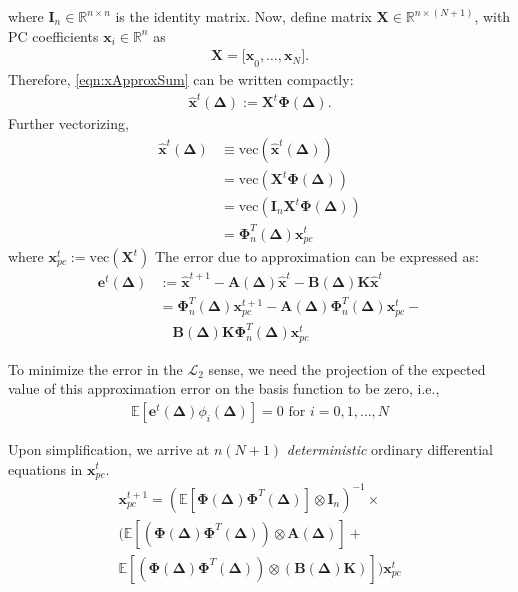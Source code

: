 \documentclass[letterpaper, 10 pt, conference]{ieeeconf}  %
\newcommand{\real}{\mathbb{R}}
\newcommand{\vo}[1]{\boldsymbol{#1}}
\newcommand{\Del}{\vo{\Delta}}
\begin{document}
where $\vo{I}_n \in \real^{n \times n}$ is the identity matrix. Now, define matrix $\vo{X} \in \real^{n \times (N+1)}$, with PC coefficients $\vo{x}_i \in \real^n$ as
\begin{align}
   \vo{X} = \vo{[x}_0, \hdots, \vo{x}_N].
\end{align}
Therefore, \eqref{eqn:xApproxSum} can be written compactly:
\begin{align}
   \vo{\hat{x}}^t(\vo{\Delta}) := \vo{X}^t\vo{\Phi}(\vo{\Delta}).
\end{align}
Further vectorizing,
\begin{align}
   \vo{\hat{x}}^t(\vo{\Delta}) &\equiv \textrm{vec}(\vo{\hat{x}}^t(\vo{\Delta})) \nonumber\\
   &= \textrm{vec}(\vo{X}^t\vo{\Phi}(\vo{\Delta})) \nonumber\\
   &= \textrm{vec}(\vo{I}_n \vo{X}^t \vo{\Phi}(\vo{\Delta})) \nonumber\\
   &= \vo{\Phi}_n^T(\vo{\Delta})\vo{x}_{pc}^t
\end{align}
where $\vo{x}_{pc}^t := \textrm{vec}(\vo{X}^t)$
The error due to approximation can be expressed as:
\begin{align}
   \vo{e}^t(\Del) &:= \vo{\hat{x}}^{t+1} - \vo{A}(\Del)\vo{\hat{x}}^t - \vo{B}(\Del)\vo{K}\vo{\hat{x}}^t \nonumber\\
   &= \vo{\Phi}_n^T(\vo{\Delta})\vo{x}_{pc}^{t+1} - \vo{A}(\Del)\vo{\Phi}_n^T(\vo{\Delta})\vo{x}_{pc}^t - \nonumber\\ & \quad \vo{B}(\Del)\vo{K}\vo{\Phi}_n^T(\vo{\Delta})\vo{x}_{pc}^t
\end{align}

To minimize the error in the $\mathcal{L}_2$ sense, we need the projection of the expected value of this approximation error on
the basis function to be zero, i.e.,
\begin{align}
   \mathbb{E}[\vo{e}^t(\Del)\phi_i(\Del)] = 0 \textrm{ for } i = 0,1,\hdots,N
\end{align}

Upon simplification, we arrive at $n(N+1)$ \textit{deterministic} ordinary differential equations in $\vo{x}_{pc}^t$.
\begin{align}
   \vo{x}_{pc}^{t+1} = (\mathbb{E}[\vo{\Phi}(\Del)  \vo{\Phi}^T(\Del)] \otimes \vo{I}_n)^{-1} \times \nonumber\\
   (\mathbb{E}[(\vo{\Phi}(\Del)  \vo{\Phi}^T(\Del)) \otimes \vo{A}(\Del)] + \nonumber\\
   \mathbb{E}[(\vo{\Phi}(\Del)  \vo{\Phi}^T(\Del)) \otimes (\vo{B}(\Del)\vo{K})])\vo{x}_{pc}^t
	\label{eqn:pcODE}
\end{align}
\end{document}
